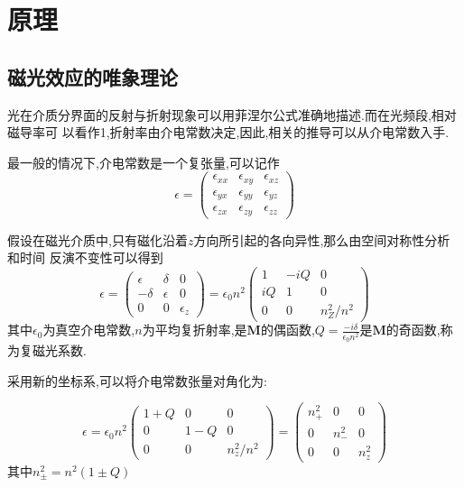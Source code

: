 \documentclass[aps,pre,12pt,preprint,onecolumn,showpacs,showkeys]{revtex4-1}
\begin{document}
\section{原理}

\subsection{磁光效应的唯象理论}

光在介质分界面的反射与折射现象可以用菲涅尔公式准确地描述.而在光频段,相对磁导率可
以看作1,折射率由介电常数决定,因此,相关的推导可以从介电常数入手.

最一般的情况下,介电常数是一个复张量,可以记作
\begin{equation}
    \epsilon =
    \begin{pmatrix}
        \epsilon_{xx} &\epsilon_{xy} &\epsilon_{xz}\\ 
        \epsilon_{yx} &\epsilon_{yy} &\epsilon_{yz}\\ 
        \epsilon_{zx} &\epsilon_{zy} &\epsilon_{zz} 
    \end{pmatrix}
\end{equation}

假设在磁光介质中,只有磁化沿着$z$方向所引起的各向异性,那么由空间对称性分析和时间
反演不变性可以得到
\begin{equation}
    \epsilon = 
    \begin{pmatrix}
        \epsilon & \delta & 0 \\
        -\delta & \epsilon & 0 \\
        0 & 0 & \epsilon_z
    \end{pmatrix}
    = \epsilon_0 n^2
    \begin{pmatrix}
        1 & -iQ & 0 \\
        iQ & 1 & 0 \\
        0 & 0 & n_Z^2/n^2
    \end{pmatrix}
\end{equation}
其中$\epsilon_0$为真空介电常数,$n$为平均复折射率,是$\mathbf{M}$的偶函数,$Q =
\frac{-i\delta}{\epsilon_0n^2}$是$\mathbf{M}$的奇函数,称为复磁光系数.

采用新的坐标系,可以将介电常数张量对角化为:

\begin{equation}
    \epsilon = \epsilon_0n^2
    \begin{pmatrix}
        1 + Q & 0 & 0 \\
        0 & 1 - Q & 0 \\
        0 & 0 & n_z^2/n^2
    \end{pmatrix} = 
    \begin{pmatrix}
        n_+^2 & 0 & 0 \\
        0 & n_-^2 & 0 \\
        0 & 0 & n_z^2
    \end{pmatrix}
\end{equation}
其中$n_{\pm}^2 = n^2(1\pm Q)$
\end{document}
